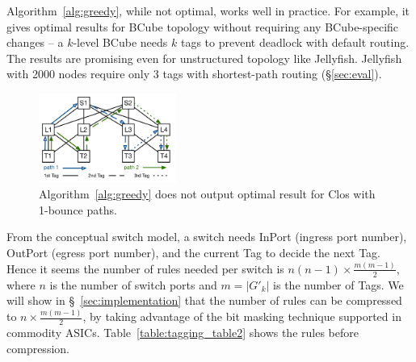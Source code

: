 


 Algorithm~\ref{alg:greedy}, while not optimal, works well
in practice. For example, it gives optimal results for BCube topology without
requiring any BCube-specific changes -- a $k$-level BCube needs $k$ tags to
prevent deadlock with default routing. The results are promising even for
unstructured topology like Jellyfish. Jellyfish with 2000 nodes require only 3
tags with shortest-path routing (\S\ref{sec:eval}).

\begin{figure}[t]
	\centering
	\includegraphics[width=0.4\textwidth] {figs/nonoptimal_example}
	\vspace{-0.15in}
	\caption{Algorithm~\ref{alg:greedy} does not output optimal result for Clos with 1-bounce paths.}
	\label{fig:nonoptimal}
	\vspace{-0.2in}
\end{figure}

 From the conceptual switch model, a switch needs InPort 
(ingress port number), OutPort (egress port number), and the current Tag to decide the next Tag.
Hence it seems the number of rules needed per switch is $n(n-1)\times
\frac{m(m-1)}{2}$, where $n$ is the number of switch ports and $m=|G'_{k}|$ is
the number of Tags. We will show in \S~\ref{sec:implementation} that the number
of rules can be compressed to  $n\times \frac{m(m-1)}{2}$, by taking advantage
of the bit masking technique supported in commodity ASICs.
Table~\ref{table:tagging_table2} shows the rules before compression.

